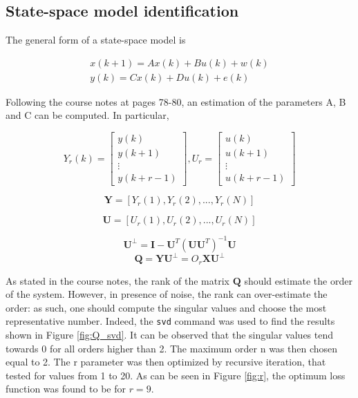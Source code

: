 \documentclass[a4paper,11pt]{article}
\begin{document}
\subsection{State-space model identification}

The general form of a state-space model is

\begin{equation}
\begin{split}
x(k+1)=Ax(k)+Bu(k)+w(k) \\
y(k)=Cx(k)+Du(k)+e(k)
\end{split}
\end{equation}

Following the course notes at pages 78-80, an estimation of the parameters A, B and C can be computed. In particular, 

\begin{equation}
Y_r(k)=\begin{bmatrix}
y(k)\\
y(k+1)\\
\vdots \\
y(k+r-1)
\end{bmatrix} , 
U_r=\begin{bmatrix}
u(k)\\
u(k+1)\\
\vdots \\
u(k+r-1)
\end{bmatrix}
\end{equation}

\begin{equation}
\textbf{Y} = [Y_r(1),Y_r(2),...,Y_r(N)]
\end{equation}

\begin{equation}
\textbf{U} = [U_r(1),U_r(2),...,U_r(N)]
\end{equation}

\begin{equation}
\textbf{U}^{\perp}=\textbf{I}-\textbf{U}^T(\textbf{UU}^T)^{-1}\textbf{U}
\end{equation}
\begin{equation}
\textbf{Q}=\textbf{YU}^{\perp} = O_r\textbf{XU}^{\perp}
\end{equation}

As stated in the course notes, the rank of the matrix $\textbf{Q}$ should estimate the order of the system. However, in presence of noise, the rank can over-estimate the order: as such, one should compute the singular values and choose the most representative number. Indeed, the \verb'svd' command was used to find the results shown in Figure \ref{fig:Q_svd}. It can be observed that the singular values tend towards 0 for all orders higher than 2. The maximum order n was then chosen equal to 2.
The r parameter was then optimized by recursive iteration, that tested for values from 1 to 20. As can be seen in Figure \ref{fig:r}, the optimum loss function was found to be for $r=9$.
\end{document}
